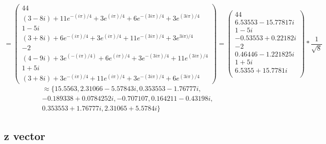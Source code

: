 \documentclass{article}
\begin{document}
\[
	=
	\begin{pmatrix}
	  44 \\
	  (3-8 i)   + 11 e^{-(i \pi)/4} + 3 e^{(i \pi)/4}  + 6 e^{-(3 i \pi)/4}   + 3 e^{(3 i \pi)/4} \\
	  1 - 5i \\
	  (3        + 8 i)             + 6 e^{-(i \pi)/4} + 3 e^{( i \pi)/4} + 11 e^{-(3 i \pi)/4}  + 3 e^{ 3 i \pi)/4} \\
	  -2 \\
	  (4-9 i)   + 3 e^(-(i \pi)/4)  + 6 e^{(i \pi)/4}  + 3 e^{-(3 i \pi)/4}   + 11 e^{(3 i \pi)/4} \\
	  1         + 5i \\
	  (3        + 8 i)             + 3 e^{-(i \pi)/4} + 11 e^{(i \pi)/4}     + 3 e^{-(3 i \pi)/4}   + 6 e^{(3 i \pi)/4}

	\end{pmatrix}
	=
	\begin{pmatrix}
	  44 \\
	  6.53553- 15.77817i \\ 
	  1 - 5i \\
	  -0.53553 + 0.22182 i \\
	  -2  \\
	  0.46446 - 1.221825 i \\
	  1 + 5i \\
	  6.5355 + 15.7781 i \\
	\end{pmatrix}
	*
   \frac{1}{\sqrt{8}} 
 \]
 \begin{align*}
   \approx
   \{15.5563, 2.31066-5.57843 i, 0.353553-1.76777 i,\\
	 -0.189338+0.0784252 i, -0.707107, 0.164211-0.43198 i, \\
   0.353553+1.76777 i, 2.31065+5.5784 i\}
 \end{align*}


\subsection{z vector}
\end{document}
